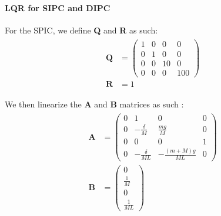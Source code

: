 \documentclass{article}
\theoremstyle{plain}
\theoremstyle{definition}
\theoremstyle{remark}
\begin{document}
\paragraph{LQR for SIPC and DIPC}
For the SPIC, we define \textbf{Q} and \textbf{R} as such:
\begin{gather*}
    \begin{aligned}
        \textbf{Q} &= \begin{pmatrix}
            1 & 0 & 0 & 0 \\
            0 & 1 & 0 & 0 \\
            0 & 0 & 10 & 0 \\
            0 & 0 & 0 & 100
        \end{pmatrix} \\
        \textbf{R} &= 1
    \end{aligned}
\end{gather*}

We then linearize the \textbf{A} and \textbf{B} matrices as such \cite{BruntonSIPC}:
\begin{gather*}
    \begin{aligned}
        \textbf{A} &= \begin{pmatrix}
            0 & 1 & 0 & 0 \\
            0 & -\frac{\delta}{M} & \frac{mg}{M} & 0 \\
            0 & 0 & 0 & 1 \\
            0 & -\frac{\delta}{ML} & -\frac{(m+M)g}{ML} & 0
        \end{pmatrix} \\
        \textbf{B} &= \begin{pmatrix}
            0 \\
            \frac{1}{M} \\
            0 \\
            \frac{1}{ML}
        \end{pmatrix}
    \end{aligned}
\end{gather*}
\end{document}

